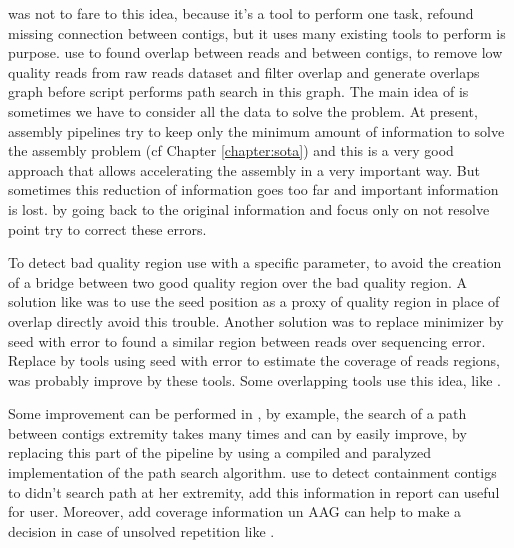 \documentclass[main.tex]{subfiles}
\begin{document}
\bigskip

\knot was not to fare to this idea, because it's a tool to perform one task, refound missing connection between contigs, but it uses many existing tools to perform is purpose. \knot use \minimap to found overlap between reads and between contigs, \yacrd to remove low quality reads from raw reads dataset and \fpa filter overlap and generate overlaps graph before \knot script performs path search in this graph. The main idea of \knot is sometimes we have to consider all the data to solve the problem. At present, assembly pipelines try to keep only the minimum amount of information to solve the assembly problem (cf Chapter \ref{chapter:sota}) and this is a very good approach that allows accelerating the assembly in a very important way. But sometimes this reduction of information goes too far and important information is lost. \knot by going back to the original information and focus only on not resolve point try to correct these errors.

To detect bad quality region \yacrd use \minimap with a specific parameter, to avoid the creation of a bridge between two good quality region over the bad quality region. A solution like \miniscrub was to use the seed position as a proxy of quality region in place of overlap directly avoid this trouble. Another solution was to replace minimizer by seed with error to found a similar region between reads over sequencing error. Replace \minimap by tools using seed with error to estimate the coverage of reads regions, was probably improve by these tools. Some overlapping tools use this idea, like \cite{GroupK}.

\bigskip

Some improvement can be performed in \knot, by example, the search of a path between contigs extremity takes many times and can by easily improve,  by replacing this part of the pipeline by using a compiled and paralyzed implementation of the path search algorithm. \knot use \minimap to detect containment contigs to didn't search path at her extremity, add this information in \knot report can useful for user. Moreover, add coverage information un AAG can help to make a decision in case of unsolved repetition like \flye.

\end{document}
